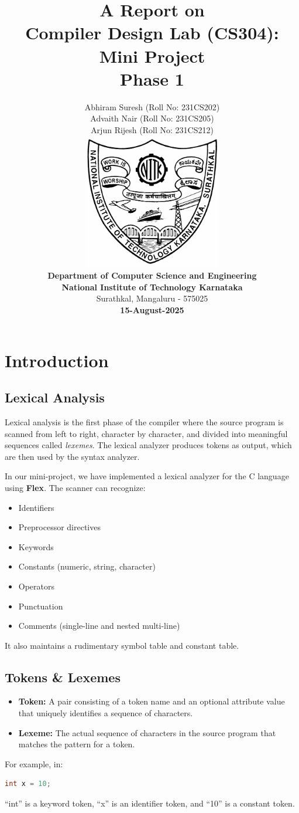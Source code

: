 \documentclass[12pt,a4paper]{article}
\title{\textbf{A Report on\\Compiler Design Lab (CS304): Mini Project\\Phase 1}}
\author{
Abhiram Suresh (Roll No: 231CS202)\\
Advaith Nair (Roll No: 231CS205)\\
Arjun Rijesh (Roll No: 231CS212)\\[0.5cm]
\includegraphics[width=6cm]{nitk_logo.png} \\[0.5cm]
\textbf{Department of Computer Science and Engineering}\\
\textbf{National Institute of Technology Karnataka}\\
Surathkal, Mangaluru - 575025\\[0.5cm]
\textbf{15-August-2025}\\[5cm]
}
\date{}
\begin{document}
\maketitle

\section{Introduction}

\subsection{Lexical Analysis}
Lexical analysis is the first phase of the compiler where the source program is scanned from left to right, character by character, and divided into meaningful sequences called \textit{lexemes}. The lexical analyzer produces tokens as output, which are then used by the syntax analyzer.

In our mini-project, we have implemented a lexical analyzer for the C language using \textbf{Flex}. The scanner can recognize:
\begin{itemize}
    \item Identifiers
    \item Preprocessor directives
    \item Keywords
    \item Constants (numeric, string, character)
    \item Operators
    \item Punctuation
    \item Comments (single-line and nested multi-line)
\end{itemize}
It also maintains a rudimentary symbol table and constant table.

\subsection{Tokens \& Lexemes}
\begin{itemize}
    \item \textbf{Token:} A pair consisting of a token name and an optional attribute value that uniquely identifies a sequence of characters.
    \item \textbf{Lexeme:} The actual sequence of characters in the source program that matches the pattern for a token.
\end{itemize}
For example, in:
\begin{lstlisting}[language=C]
int x = 10;
\end{lstlisting}
``int'' is a keyword token, ``x'' is an identifier token, and ``10'' is a constant token.\\[5cm]
\end{document}
